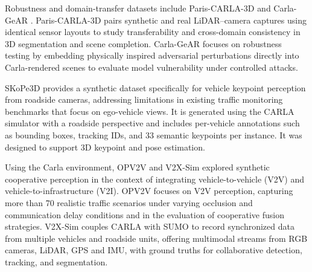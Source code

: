 

Robustness and domain-transfer datasets include Paris-CARLA-3D \cite{deschaud2021} and Carla-GeAR \cite{Nesti2024CARLA-GeAR:Models}. Paris-CARLA-3D pairs synthetic and real LiDAR–camera captures using identical sensor layouts to study transferability and cross-domain consistency in 3D segmentation and scene completion. Carla-GeAR focuses on robustness testing by embedding physically inspired adversarial perturbations directly into Carla-rendered scenes to evaluate model vulnerability under controlled attacks.


SKoPe3D \cite{Pahadia2023SKoPe3D:Cameras} provides a synthetic dataset specifically for vehicle keypoint perception from roadside cameras, addressing limitations in existing traffic monitoring benchmarks that focus on ego-vehicle views. It is generated using the CARLA simulator with a roadside perspective and includes per-vehicle annotations such as bounding boxes, tracking IDs, and 33 semantic keypoints per instance. It was designed to support 3D keypoint and pose estimation.


Using the Carla environment, OPV2V  and V2X-Sim  explored synthetic cooperative perception in the context of integrating vehicle-to-vehicle (V2V) and vehicle-to-infrastructure (V2I). OPV2V \cite{xu2022opv2vopenbenchmarkdataset} focuses on V2V perception, capturing more than 70 realistic traffic scenarios under varying occlusion and communication delay conditions and in the evaluation of cooperative fusion strategies. V2X-Sim \cite{Li2022V2X-Sim:Driving} couples CARLA with SUMO \cite{behrisch2011sumo} to record synchronized data from multiple vehicles and roadside units, offering multimodal streams from RGB cameras, LiDAR, GPS and IMU, with ground truths for collaborative detection, tracking, and segmentation. 

